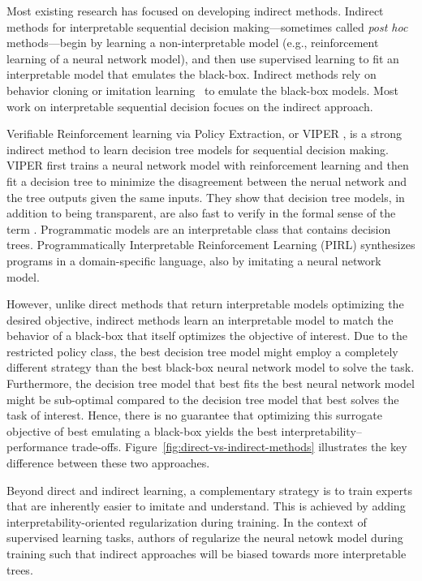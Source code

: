 Most existing research has focused on developing indirect methods. 
Indirect methods for interpretable sequential decision making—sometimes called \textit{post hoc} methods—begin by learning a non-interpretable model (e.g., reinforcement learning of a neural network model), and then use supervised learning to fit an interpretable model that emulates the black-box.
Indirect methods rely on behavior cloning or imitation learning~\cite{behavior-cloning,dagger} to emulate the black-box models.
Most work on interpretable sequential decision focues on the indirect approach\cite{viper,PIRL}.

Verifiable Reinforcement learning via Policy Extraction, or VIPER \cite{viper}, is a strong indirect method to learn decision tree models for sequential decision making. VIPER first trains a neural network model with reinforcement learning and then fit a decision tree to minimize the disagreement between the nerual network and the tree outputs given the same inputs.
They show that decision tree models, in addition to being transparent, are also fast to verify in the formal sense of the term \cite{maraboupy}.
Programmatic models are an interpretable class that contains decision trees. 
Programmatically Interpretable Reinforcement Learning (PIRL) \cite{PIRL} synthesizes programs in a domain-specific language, also by imitating a neural network model. 

However, unlike direct methods that return interpretable models optimizing the desired objective, indirect methods learn an interpretable model to match the behavior of a black-box that itself optimizes the objective of interest. 
Due to the restricted policy class, the best decision tree model might employ a completely different strategy than the best black-box neural network model to solve the task.
Furthermore, the decision tree model that best fits the best neural network model might be sub-optimal compared to the decision tree model that best solves the task of interest.
Hence, there is no guarantee that optimizing this surrogate objective of best emulating a black-box yields the best interpretability–performance trade-offs. 
Figure~\ref{fig:direct-vs-indirect-methods} illustrates the key difference between these two approaches. 

Beyond direct and indirect learning, a complementary strategy is to train experts that are inherently easier to imitate and understand.
This is achieved by adding interpretability-oriented regularization during training. In the context of supervised learning tasks, authors of \cite{parbhoo} regularize the neural netowk model during training such that indirect approaches will be biased towards more interpretable trees.

